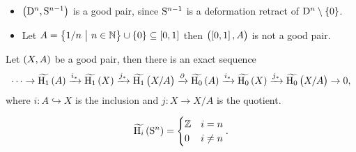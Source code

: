 \begin{example*}
\hfill
\begin{itemize}
\item $ \br{\D^n, \S^{n - 1}} $ is a good pair, since $ \S^{n - 1} $ is a deformation retract of $ \D^n \setminus \cbr{0} $.
\item Let $ A = \cbr{1 / n \st n \in \NN} \cup \cbr{0} \subseteq \sbr{0, 1} $ then $ \br{\sbr{0, 1}, A} $ is not a good pair.
\end{itemize}
\end{example*}

\begin{theorem}
\label{thm:2.13}
Let $ \br{X, A} $ be a good pair, then there is an exact sequence
$$ \dots \to \widetilde{\H_1}\br{A} \xrightarrow{i_*} \widetilde{\H_1}\br{X} \xrightarrow{j_*} \widetilde{\H_1}\br{X / A} \xrightarrow{\da} \widetilde{\H_0}\br{A} \xrightarrow{i_*} \widetilde{\H_0}\br{X} \xrightarrow{j_*} \widetilde{\H_0}\br{X / A} \to 0, $$
where $ i : A \hookrightarrow X $ is the inclusion and $ j : X \to X / A $ is the quotient.
\end{theorem}

\begin{corollary}
$$ \widetilde{\H_i}\br{\S^n} =
\begin{cases}
\ZZ & i = n \\
0 & i \ne n
\end{cases}.
$$
\end{corollary}

\pagebreak

